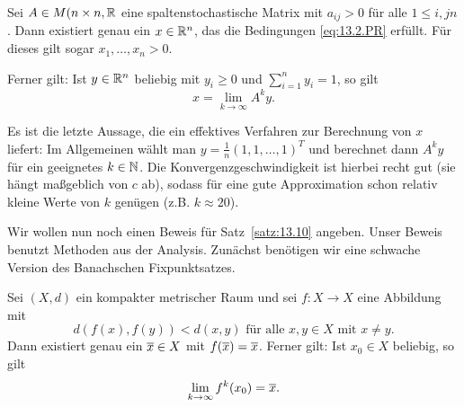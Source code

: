 \begin{satz}
	\label{satz:13.10}
	Sei $A \in M(n \times n, \mathbb{R}$ eine spaltenstochastische Matrix mit $a_{ij} > 0$ für alle $1 \leq i,j n$.
	Dann existiert genau ein $x \in \mathbb{R}^n$, das die Bedingungen \eqref{eq:13.2.PR} erfüllt.
	Für dieses gilt sogar $x_1,\dots,x_n > 0$.
	
	Ferner gilt: Ist $y \in \mathbb{R}^n$ beliebig mit $y_i \geq 0$ und $\sum_{i=1}^{n} y_i = 1$, so gilt
	\[
		x = \lim\limits_{k \rightarrow \infty} A^k y.
	\]
\end{satz}

\begin{bemerkung}
	\label{bem:13.11}
	Es ist die letzte Aussage, die ein effektives Verfahren zur Berechnung von $x$ liefert:
	Im Allgemeinen wählt man $y = \frac{1}{n} (1,1,\dots,1)^T$ und berechnet dann $A^ky$ für ein geeignetes $k \in \mathbb{N}$.
	Die Konvergenzgeschwindigkeit ist hierbei recht gut (sie hängt maßgeblich von $c$ ab), sodass für eine gute Approximation schon relativ kleine Werte von $k$ genügen (z.B. $k \approx 20$).
\end{bemerkung}

Wir wollen nun noch einen Beweis für Satz~\ref{satz:13.10} angeben.
Unser Beweis benutzt Methoden aus der Analysis.
Zunächst benötigen wir eine schwache Version des Banachschen Fixpunktsatzes.

\begin{satz}
	\label{satz:13.12}
	Sei $(X,d)$ ein kompakter metrischer Raum und sei $f \colon X \rightarrow X$ eine Abbildung mit
	\begin{equation}
		d(f(x),f(y)) < d(x,y) \text{ für alle } x,y \in X \text{ mit } x \neq y. \label{eq:13.12}
	\end{equation}
	Dann existiert genau ein $\overline{x} \in X$ mit $f(\overline{x}) = \overline{x}$.
	Ferner gilt: Ist $x_0 \in X$ beliebig, so gilt
	\[
		\lim\limits_{k \rightarrow \infty} f^k(x_0) = \overline{x}.
	\]
\end{satz}

